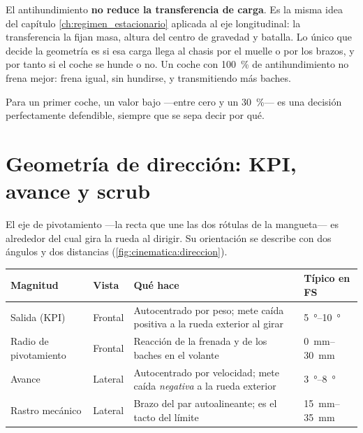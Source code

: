 \begin{clave}
El antihundimiento \textbf{no reduce la transferencia de carga}. Es la misma
idea del capítulo \ref{ch:regimen_estacionario} aplicada al eje longitudinal:
la transferencia la fijan masa, altura del centro de gravedad y batalla. Lo
único que decide la geometría es si esa carga llega al chasis por el muelle o
por los brazos, y por tanto si el coche se hunde o no. Un coche con
\SI{100}{\percent} de antihundimiento no frena mejor: frena igual, sin
hundirse, y transmitiendo más baches.

Para un primer coche, un valor bajo ---entre cero y un \SI{30}{\percent}--- es
una decisión perfectamente defendible, siempre que se sepa decir por qué.
\end{clave}

\section{Geometría de dirección: KPI, avance y scrub}
\label{sec:cinematica_suspension:05}

El eje de pivotamiento ---la recta que une las dos rótulas de la mangueta--- es
alrededor del cual gira la rueda al dirigir. Su orientación se describe con dos
ángulos y dos distancias (\cref{fig:cinematica:direccion}).

\begin{center}
\begin{tabularx}{\textwidth}{@{}llXl@{}}
\toprule
\textbf{Magnitud} & \textbf{Vista} & \textbf{Qué hace} & \textbf{Típico en FS} \\
\midrule
Salida (KPI) & Frontal & Autocentrado por peso; mete caída positiva a la rueda exterior al girar & \SIrange{5}{10}{\degree} \\
Radio de pivotamiento & Frontal & Reacción de la frenada y de los baches en el volante & \SIrange{0}{30}{\milli\meter} \\
Avance & Lateral & Autocentrado por velocidad; mete caída \emph{negativa} a la rueda exterior & \SIrange{3}{8}{\degree} \\
Rastro mecánico & Lateral & Brazo del par autoalineante; es el tacto del límite & \SIrange{15}{35}{\milli\meter} \\
\bottomrule
\end{tabularx}
\end{center}

